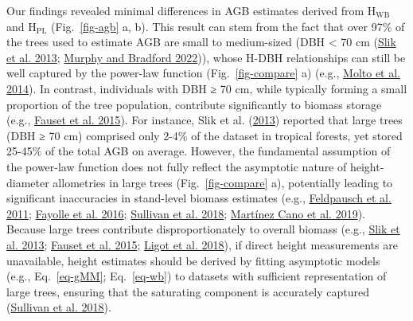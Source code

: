 \documentclass[
  12pt,
  letterpaper,
  DIV=11,
  numbers=noendperiod]{scrartcl}
\begin{document}
Our findings revealed minimal differences in AGB estimates derived from
\(\text{H}_\text{WB}\) and \(\text{H}_\text{PL}\) (Fig.~\ref{fig-agb} a,
b). This result can stem from the fact that over 97\% of the trees used
to estimate AGB are small to medium-sized (DBH \textless{} 70 cm
(\protect\hyperlink{ref-Slik2013}{Slik et al. 2013};
\protect\hyperlink{ref-Murphy2022}{Murphy and Bradford 2022})), whose
H-DBH relationships can still be well captured by the power-law function
(Fig.~\ref{fig-compare} a) (e.g.,
\protect\hyperlink{ref-Molto2014}{Molto et al. 2014}). In contrast,
individuals with DBH ≥ 70 cm, while typically forming a small proportion
of the tree population, contribute significantly to biomass storage
(e.g., \protect\hyperlink{ref-Fauset2015}{Fauset et al. 2015}). For
instance, Slik et al. (\protect\hyperlink{ref-Slik2013}{2013}) reported
that large trees (DBH ≥ 70 cm) comprised only 2-4\% of the dataset in
tropical forests, yet stored 25-45\% of the total AGB on average.
However, the fundamental assumption of the power-law function does not
fully reflect the asymptotic nature of height-diameter allometries in
large trees (Fig.~\ref{fig-compare} a), potentially leading to
significant inaccuracies in stand-level biomass estimates (e.g.,
\protect\hyperlink{ref-Feldpausch2011}{Feldpausch et al. 2011};
\protect\hyperlink{ref-Fayolle2016}{Fayolle et al. 2016};
\protect\hyperlink{ref-Sullivan2018}{Sullivan et al. 2018};
\protect\hyperlink{ref-MartinezCano2019}{Martínez Cano et al. 2019}).
Because large trees contribute disproportionately to overall biomass
(e.g., \protect\hyperlink{ref-Slik2013}{Slik et al. 2013};
\protect\hyperlink{ref-Fauset2015}{Fauset et al. 2015};
\protect\hyperlink{ref-Ligot2018}{Ligot et al. 2018}), if direct height
measurements are unavailable, height estimates should be derived by
fitting asymptotic models (e.g., Eq.~\ref{eq-gMM}; Eq.~\ref{eq-wb}) to
datasets with sufficient representation of large trees, ensuring that
the saturating component is accurately captured
(\protect\hyperlink{ref-Sullivan2018}{Sullivan et al. 2018}).
\end{document}
